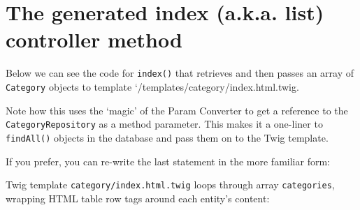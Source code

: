 \documentclass[a4paperpaper,openright]{book}
\newenvironment{Shaded}{}{}
\newcommand{\CommentTok}[1]{\textcolor[rgb]{0.38,0.63,0.69}{\textit{#1}}}
\newcommand{\KeywordTok}[1]{\textcolor[rgb]{0.00,0.44,0.13}{\textbf{#1}}}
\newcommand{\NormalTok}[1]{#1}
\newcommand{\OtherTok}[1]{\textcolor[rgb]{0.00,0.44,0.13}{#1}}
\newcommand{\StringTok}[1]{\textcolor[rgb]{0.25,0.44,0.63}{#1}}
\begin{document}
\hypertarget{the-generated-index-a.k.a.-list-controller-method}{%
\section{The generated index (a.k.a. list) controller
method}\label{the-generated-index-a.k.a.-list-controller-method}}

Below we can see the code for \texttt{index()} that retrieves and then
passes an array of \texttt{Category} objects to template
`/templates/category/index.html.twig.

\begin{Shaded}
\end{Shaded}

Note how this uses the `magic' of the Param Converter to get a reference
to the \texttt{CategoryRepository} as a method parameter. This makes it
a one-liner to \texttt{findAll()} objects in the database and pass them
on to the Twig template.

If you prefer, you can re-write the last statement in the more familiar
form:

\begin{Shaded}
\end{Shaded}

Twig template \texttt{category/index.html.twig} loops through array
\texttt{categories}, wrapping HTML table row tags around each entity's
content:
\end{document}
